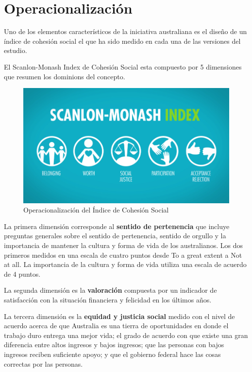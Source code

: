 \documentclass[
  12pt,
]{book}
\begin{document}
\hypertarget{operacionalizaciuxf3n-1}{%
\section{Operacionalización}\label{operacionalizaciuxf3n-1}}

Uno de los elementos característicos de la iniciativa australiana es el
diseño de un índice de cohesión social el que ha sido medido en cada una
de las versiones del estudio.

El Scanlon-Monash Index de Cohesión Social esta compuesto por 5
dimensiones que resumen los dominions del concepto.

\begin{figure}[H]

{\centering \includegraphics[width=0.75\linewidth]{inputs/images/scalon} 

}

\caption{Operacionalización del Índice de Cohesión Social}\label{fig:scalon}
\end{figure}

La primera dimensión corresponde al \textbf{sentido de pertenencia} que
incluye preguntas generales sobre el sentido de pertenencia, sentido de
orgullo y la importancia de mantener la cultura y forma de vida de los
australianos. Los dos primeros medidos en una escala de cuatro puntos
desde To a great extent a Not at all. La importancia de la cultura y
forma de vida utiliza una escala de acuerdo de 4 puntos.

La segunda dimensión es la \textbf{valoración} compuesta por un indicador de
satisfacción con la situación financiera y felicidad en los últimos
años.

La tercera dimensión es la \textbf{equidad y justicia social} medido con el
nivel de acuerdo acerca de que Australia es una tierra de oportunidades
en donde el trabajo duro entrega una mejor vida; el grado de acuerdo con
que existe una gran diferencia entre altos ingresos y bajos ingresos;
que las personas con bajos ingresos reciben suficiente apoyo; y que el
gobierno federal hace las cosas correctas por las personas.
\end{document}
